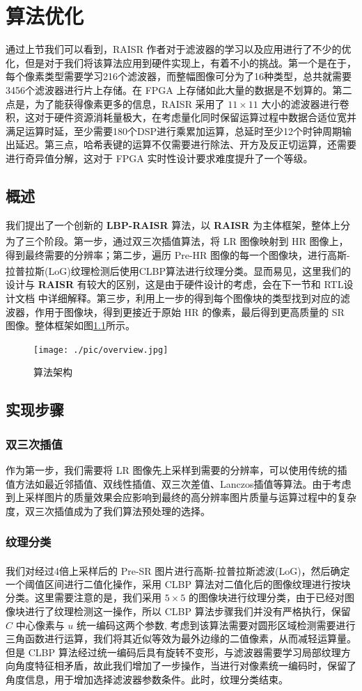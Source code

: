 \documentclass[12pt, a4paper, oneside]{ctexbook}
\begin{document}
	\chapter{算法优化}
	通过上节我们可以看到，RAISR 作者对于滤波器的学习以及应用进行了不少的优化，但是对于我们将该算法应用到硬件实现上，有着不小的挑战。第一个是在于，每个像素类型需要学习216个滤波器，而整幅图像可分为了16种类型，总共就需要3456个滤波器进行片上存储。在 FPGA 上存储如此大量的数据是不划算的。第二点是，为了能获得像素更多的信息，RAISR 采用了 $11\times11$ 大小的滤波器进行卷积，这对于硬件资源消耗量极大，在考虑量化同时保留运算过程中数据合适位宽并满足运算时延，至少需要180个DSP进行乘累加运算，总延时至少12个时钟周期输出延迟。第三点，哈希表键的运算不仅需要进行除法、开方及反正切运算，还需要进行奇异值分解，这对于 FPGA 实时性设计要求难度提升了一个等级。
	\section{概述}
	我们提出了一个创新的 \textbf{LBP-RAISR} 算法，以 \textbf{RAISR} 为主体框架，整体上分为了三个阶段。第一步，通过双三次插值算法\textsuperscript{\cite{4}\cite{5}}，将 LR 图像映射到 HR 图像上，得到最终需要的分辨率；第二步，遍历 Pre-HR 图像的每一个图像块，进行高斯-拉普拉斯(LoG)纹理检测后使用CLBP算法\textsuperscript{\cite{8}\cite{9}}进行纹理分类。显而易见，这里我们的设计与 \textbf{RAISR} 有较大的区别，这是由于硬件设计的考虑，会在下一节和 RTL设计文档 中详细解释。第三步，利用上一步的得到每个图像块的类型找到对应的滤波器，作用于图像块，得到更接近于原始 HR 的像素，最后得到更高质量的 SR 图像。整体框架如图\ref{overview}所示。
	\begin{figure}[h]
		\centering
		\texttt{[image: ./pic/overview.jpg]}
		\caption{算法架构}
		\label{overview}
	\end{figure}
	\section{实现步骤}
	\subsection{双三次插值}
	作为第一步，我们需要将 LR 图像先上采样到需要的分辨率，可以使用传统的插值方法如最近邻插值、双线性插值、双三次差值、Lanczos插值等算法。由于考虑到上采样图片的质量效果会应影响到最终的高分辨率图片质量与运算过程中的复杂度，双三次插值成为了我们算法预处理的选择。
	\subsection{纹理分类}
	我们对经过4倍上采样后的 Pre-SR 图片进行高斯-拉普拉斯滤波(LoG)\textsuperscript{\cite{12}}，然后确定一个阈值区间进行二值化操作，采用 CLBP 算法对二值化后的图像纹理进行按块分类。这里需要注意的是，我们采用 $5 \times 5$ 的图像块进行纹理分类，由于已经对图像块进行了纹理检测这一操作，所以 CLBP 算法步骤我们并没有严格执行，保留 $C$ 中心像素与 $u$ 统一编码这两个参数, 考虑到该算法需要对圆形区域检测需要进行三角函数进行运算，我们将其近似等效为最外边缘的二值像素，从而减轻运算量。但是 CLBP 算法经过统一编码后具有旋转不变形，与滤波器需要学习局部纹理方向角度特征相矛盾，故此我们增加了一步操作，当进行对像素统一编码时，保留了角度信息，用于增加选择滤波器参数条件。此时，纹理分类结束。
\end{document}
